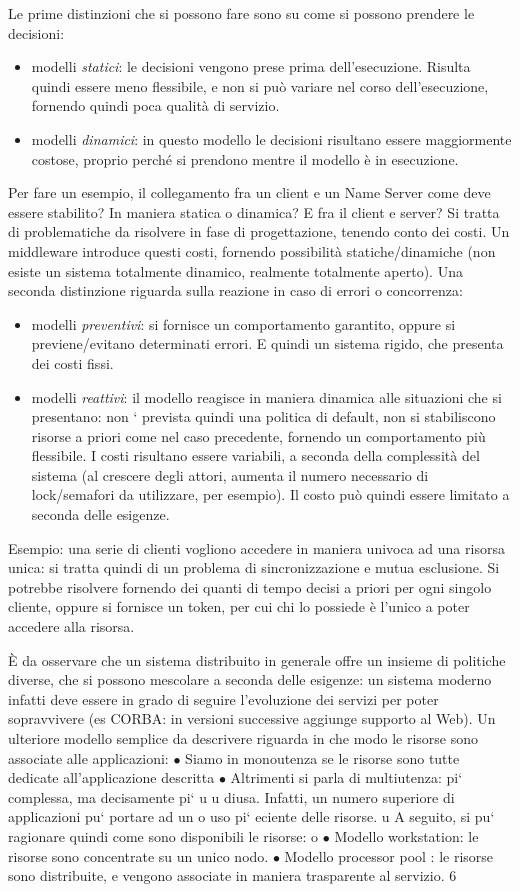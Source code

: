 \documentclass[a4paper,12pt]{article}
\begin{document}
Le prime distinzioni che si possono fare sono su come si possono prendere le decisioni:
\begin{itemize}
 \item modelli \textit{statici}: le decisioni vengono prese prima dell'esecuzione. Risulta quindi essere meno
flessibile, e non si può variare nel corso dell'esecuzione, fornendo quindi poca qualità di servizio.
\item modelli \textit{dinamici}: in questo modello le decisioni risultano essere maggiormente costose, proprio perché 
si prendono mentre il modello è in esecuzione.
\end{itemize}
Per fare un esempio, il collegamento fra un client e un Name Server come deve essere stabilito? In maniera statica o
dinamica? E fra il client e server? Si tratta di problematiche da risolvere in fase di progettazione, tenendo conto 
dei costi. Un middleware introduce questi costi, fornendo possibilità statiche/dinamiche (non esiste un sistema
totalmente dinamico, realmente totalmente aperto).
Una seconda distinzione riguarda sulla reazione in caso di errori o concorrenza:
\begin{itemize}
 \item modelli \textit{preventivi}: si fornisce un comportamento garantito, oppure si previene/evitano determinati
errori. E quindi un sistema rigido, che presenta dei costi fissi.
\item modelli \textit{reattivi}: il modello reagisce in maniera dinamica alle situazioni che si presentano: non `
prevista quindi una politica di default, non si stabiliscono risorse a priori come nel caso precedente, fornendo un
comportamento più flessibile. I costi risultano essere variabili, a seconda della complessità del sistema (al crescere
degli attori, aumenta il numero necessario di lock/semafori da utilizzare, per esempio). Il costo può quindi essere
limitato a seconda delle esigenze. 
\end{itemize}
Esempio: una serie di clienti vogliono accedere in maniera univoca ad una risorsa unica: si tratta quindi di un problema
di sincronizzazione e mutua esclusione.
Si potrebbe risolvere fornendo dei quanti di tempo decisi a priori per ogni singolo cliente, oppure si fornisce un
token, per cui chi lo possiede è l'unico a poter accedere alla risorsa.

È da osservare che un sistema distribuito in generale offre un insieme di politiche diverse, che si possono mescolare a
seconda delle esigenze: un sistema moderno infatti deve essere in grado di seguire l'evoluzione dei servizi per poter
sopravvivere (es CORBA: in versioni successive aggiunge supporto al Web).
Un ulteriore modello semplice da descrivere riguarda in che modo le risorse
sono associate alle applicazioni:
$\bullet$ Siamo in monoutenza se le risorse sono tutte dedicate all'applicazione
descritta
$\bullet$ Altrimenti si parla di multiutenza: pi` complessa, ma decisamente pi`
u
u
diusa. Infatti, un numero superiore di applicazioni pu` portare ad un
o
uso pi` eciente delle risorse.
u
A seguito, si pu` ragionare quindi come sono disponibili le risorse:
o
$\bullet$ Modello workstation: le risorse sono concentrate su un unico nodo.
$\bullet$ Modello processor pool : le risorse sono distribuite, e vengono associate in
maniera trasparente al servizio.
6
\end{document}
